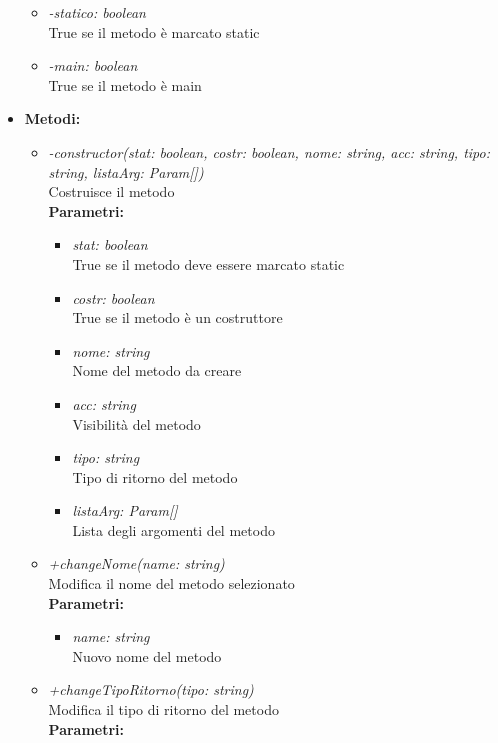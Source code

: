 \begin{itemize}
\begin{itemize}
    		\item \emph{-statico: boolean}\\
    		True se il metodo è marcato static
    		\item \emph{-main: boolean}\\
    		True se il metodo è main
		\end{itemize}
	\item \textbf{Metodi:}
		\begin{itemize}
			\item \emph{-constructor(stat: boolean, costr: boolean, nome: string, acc: string, tipo: string, listaArg: Param[])}\\
    		Costruisce il metodo\\
    		\textbf{Parametri:}
    		\begin{itemize}
    			\item \emph{stat: boolean}\\
    			True se il metodo deve essere marcato static
    			\item \emph{costr: boolean}\\
    			True se il metodo è un costruttore
    			\item \emph{nome: string}\\
    			Nome del metodo da creare
    			\item \emph{acc: string}\\
    			Visibilità del metodo
    			\item \emph{tipo: string}\\
    			Tipo di ritorno del metodo
    			\item \emph{listaArg: Param[]}\\
    			Lista degli argomenti del metodo
    		\end{itemize}
    		\item \emph{+changeNome(name: string)}\\
    		Modifica il nome del metodo selezionato\\
    		\textbf{Parametri:}
    		\begin{itemize}
    			\item \emph{name: string}\\
    			Nuovo nome del metodo
    		\end{itemize}
    		\item \emph{+changeTipoRitorno(tipo: string)}\\
    		Modifica il tipo di ritorno del metodo\\
    		\textbf{Parametri:}
    		\begin{itemize}

\end{itemize}
\end{itemize}
\end{itemize}
